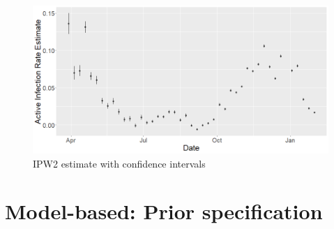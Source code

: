 \documentclass[12pt]{amsart}
\numberwithin{equation}{section}
\theoremstyle{plain}
\begin{document}
\begin{figure}[!th]
 \centering
 \includegraphics[width=.6\linewidth]{../figs/tv_air_cis.png}
 \caption{IPW2 estimate with confidence intervals}
 \label{fig:air_cis}
\end{figure}



\section{Model-based: Prior specification}
\label{app:prior_modelbased}
\end{document}
